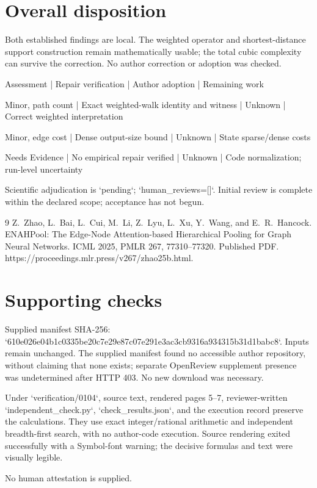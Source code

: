 \documentclass[10pt]{article}
\begin{document}
\section*{Overall disposition}
Both established findings are local. The weighted operator and shortest-distance support construction remain mathematically usable; the total cubic complexity can survive the correction. No author correction or adoption was checked.\par
Assessment | Repair verification | Author adoption | Remaining work\par
Minor, path count | Exact weighted-walk identity and witness | Unknown | Correct weighted interpretation\par
Minor, edge cost | Dense output-size bound | Unknown | State sparse/dense costs\par
Needs Evidence | No empirical repair verified | Unknown | Code normalization; run-level uncertainty\par
Scientific adjudication is `pending`; `human\_reviews=[]`. Initial review is complete within the declared scope; acceptance has not begun.\par
9 Z. Zhao, L. Bai, L. Cui, M. Li, Z. Lyu, L. Xu, Y. Wang, and E. R. Hancock. ENAHPool: The Edge-Node Attention-based Hierarchical Pooling for Graph Neural Networks. ICML 2025, PMLR 267, 77310–77320. Published PDF. https://proceedings.mlr.press/v267/zhao25b.html.\par
\section*{Supporting checks}
Supplied manifest SHA-256: `610e026e04b1c0335be20c7e29e87c07e291e3ac3cb9316a934315b31d1babc8`. Inputs remain unchanged. The supplied manifest found no accessible author repository, without claiming that none exists; separate OpenReview supplement presence was undetermined after HTTP 403. No new download was necessary.\par
Under `verification/0104`, source text, rendered pages 5–7, reviewer-written `independent\_check.py`, `check\_results.json`, and the execution record preserve the calculations. They use exact integer/rational arithmetic and independent breadth-first search, with no author-code execution. Source rendering exited successfully with a Symbol-font warning; the decisive formulas and text were visually legible.\par
No human attestation is supplied.\par
\end{document}
